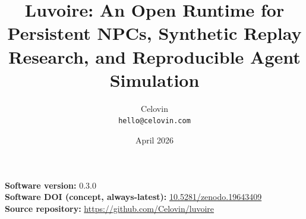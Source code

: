\documentclass[11pt]{article}
\title{Luvoire: An Open Runtime for Persistent NPCs, Synthetic Replay Research, and Reproducible Agent Simulation}
\author{Celovin\\\texttt{hello@celovin.com}}
\date{April 2026}
\newcommand{\luvoireversion}{0.3.0}
\begin{document}
\maketitle
\noindent\textbf{Software version:} \luvoireversion\\
\noindent\textbf{Software DOI (concept, always-latest):} \href{https://doi.org/10.5281/zenodo.19643409}{10.5281/zenodo.19643409}\\
\noindent\textbf{Source repository:} \url{https://github.com/Celovin/luvoire}\\









\appendix



\nocite{*}

\end{document}
